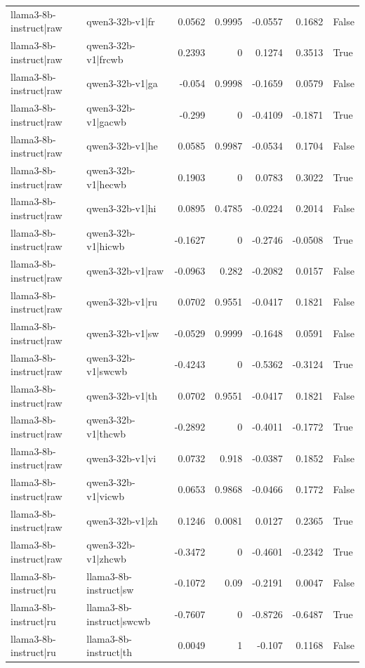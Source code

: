 \begin{table}
\begin{tabular}{l l r r r r l}
llama3-8b-instruct|raw & qwen3-32b-v1|fr & 0.0562 & 0.9995 & -0.0557 & 0.1682 & False \\
llama3-8b-instruct|raw & qwen3-32b-v1|frcwb & 0.2393 & 0 & 0.1274 & 0.3513 & True \\
llama3-8b-instruct|raw & qwen3-32b-v1|ga & -0.054 & 0.9998 & -0.1659 & 0.0579 & False \\
llama3-8b-instruct|raw & qwen3-32b-v1|gacwb & -0.299 & 0 & -0.4109 & -0.1871 & True \\
llama3-8b-instruct|raw & qwen3-32b-v1|he & 0.0585 & 0.9987 & -0.0534 & 0.1704 & False \\
llama3-8b-instruct|raw & qwen3-32b-v1|hecwb & 0.1903 & 0 & 0.0783 & 0.3022 & True \\
llama3-8b-instruct|raw & qwen3-32b-v1|hi & 0.0895 & 0.4785 & -0.0224 & 0.2014 & False \\
llama3-8b-instruct|raw & qwen3-32b-v1|hicwb & -0.1627 & 0 & -0.2746 & -0.0508 & True \\
llama3-8b-instruct|raw & qwen3-32b-v1|raw & -0.0963 & 0.282 & -0.2082 & 0.0157 & False \\
llama3-8b-instruct|raw & qwen3-32b-v1|ru & 0.0702 & 0.9551 & -0.0417 & 0.1821 & False \\
llama3-8b-instruct|raw & qwen3-32b-v1|sw & -0.0529 & 0.9999 & -0.1648 & 0.0591 & False \\
llama3-8b-instruct|raw & qwen3-32b-v1|swcwb & -0.4243 & 0 & -0.5362 & -0.3124 & True \\
llama3-8b-instruct|raw & qwen3-32b-v1|th & 0.0702 & 0.9551 & -0.0417 & 0.1821 & False \\
llama3-8b-instruct|raw & qwen3-32b-v1|thcwb & -0.2892 & 0 & -0.4011 & -0.1772 & True \\
llama3-8b-instruct|raw & qwen3-32b-v1|vi & 0.0732 & 0.918 & -0.0387 & 0.1852 & False \\
llama3-8b-instruct|raw & qwen3-32b-v1|vicwb & 0.0653 & 0.9868 & -0.0466 & 0.1772 & False \\
llama3-8b-instruct|raw & qwen3-32b-v1|zh & 0.1246 & 0.0081 & 0.0127 & 0.2365 & True \\
llama3-8b-instruct|raw & qwen3-32b-v1|zhcwb & -0.3472 & 0 & -0.4601 & -0.2342 & True \\
llama3-8b-instruct|ru & llama3-8b-instruct|sw & -0.1072 & 0.09 & -0.2191 & 0.0047 & False \\
llama3-8b-instruct|ru & llama3-8b-instruct|swcwb & -0.7607 & 0 & -0.8726 & -0.6487 & True \\
llama3-8b-instruct|ru & llama3-8b-instruct|th & 0.0049 & 1 & -0.107 & 0.1168 & False \\

\end{tabular}
\end{table}
